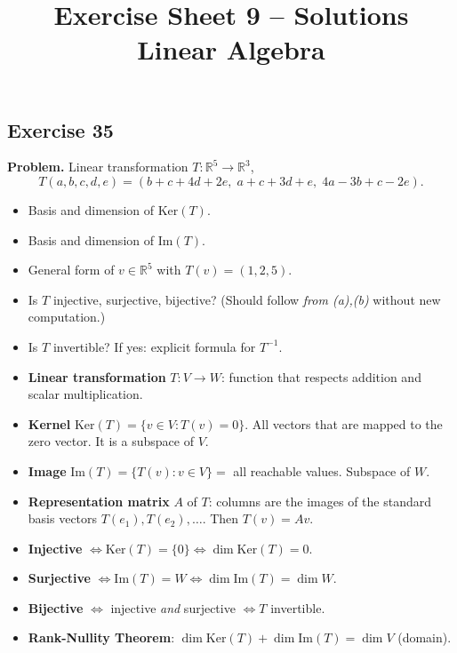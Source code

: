 \documentclass[a4paper,12pt]{article}
\title{Exercise Sheet 9 -- Solutions \\ \large Linear Algebra}
\author{}
\date{}
\begin{document}
\maketitle

\subsection*{Exercise 35}

\textbf{Problem.} Linear transformation $T \colon \mathbb{R}^5 \to \mathbb{R}^3$,
\[
T(a, b, c, d, e) = (b + c + 4d + 2e,\; a + c + 3d + e,\; 4a - 3b + c - 2e).
\]
\begin{itemize}[nosep]
\item[(a)] Basis and dimension of $\text{Ker}(T)$.
\item[(b)] Basis and dimension of $\text{Im}(T)$.
\item[(c)] General form of $v \in \mathbb{R}^5$ with $T(v) = (1, 2, 5)$.
\item[(d)] Is $T$ injective, surjective, bijective? (Should follow \emph{from (a),(b)} without new computation.)
\item[(e)] Is $T$ invertible? If yes: explicit formula for $T^{-1}$.
\end{itemize}

\begin{begriffe}
\begin{itemize}[leftmargin=*, nosep]
    \item \textbf{Linear transformation} $T \colon V \to W$: function that respects addition and scalar multiplication.
    \item \textbf{Kernel} $\text{Ker}(T) = \{v \in V : T(v) = 0\}$. All vectors that are mapped to the zero vector. It is a subspace of $V$.
    \item \textbf{Image} $\text{Im}(T) = \{T(v) : v \in V\} = $ all reachable values. Subspace of $W$.
    \item \textbf{Representation matrix} $A$ of $T$: columns are the images of the standard basis vectors $T(e_1), T(e_2), \dots$. Then $T(v) = Av$.
    \item \textbf{Injective} $\iff \text{Ker}(T) = \{0\} \iff \dim \text{Ker}(T) = 0$.
    \item \textbf{Surjective} $\iff \text{Im}(T) = W \iff \dim \text{Im}(T) = \dim W$.
    \item \textbf{Bijective} $\iff$ injective \emph{and} surjective $\iff T$ invertible.
    \item \textbf{Rank-Nullity Theorem}: $\dim \text{Ker}(T) + \dim \text{Im}(T) = \dim V$ (domain).
\end{itemize}
\end{begriffe}
\end{document}
